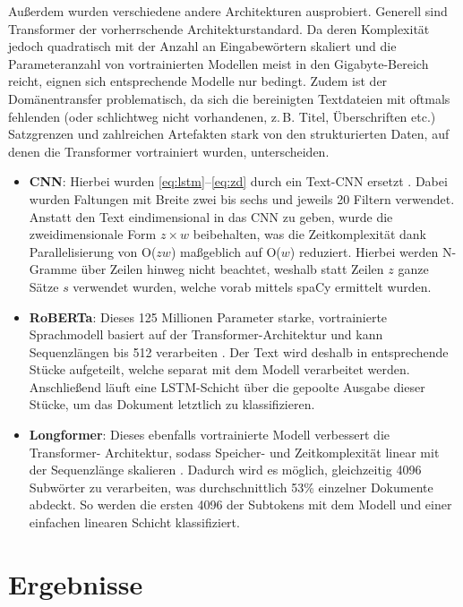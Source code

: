 \documentclass[bachelor,german]{info1thesis}
\begin{document}
%
\newpage
\noindent Außerdem wurden verschiedene andere Architekturen ausprobiert. Generell sind Transformer der vorherrschende Architekturstandard. Da deren Komplexität jedoch quadratisch mit der Anzahl an Eingabewörtern skaliert und die Parameteranzahl von vortrainierten Modellen meist in den Gigabyte-Bereich reicht, eignen sich entsprechende Modelle nur bedingt. Zudem ist der Domänentransfer problematisch, da sich die bereinigten Textdateien mit oftmals fehlenden (oder schlichtweg nicht vorhandenen, z.\,B. Titel, Überschriften etc.) Satzgrenzen und zahlreichen Artefakten stark von den strukturierten Daten, auf denen die Transformer vortrainiert wurden, unterscheiden.
\begin{itemize}
\item \textbf{CNN}: Hierbei wurden \autoref{eq:lstm}--\ref{eq:zd} durch ein Text-CNN ersetzt \cite{Kim2014}. Dabei wurden Faltungen mit Breite zwei bis sechs und jeweils 20 Filtern verwendet. Anstatt den Text eindimensional in das CNN zu geben, wurde die zweidimensionale Form $z \times w$ beibehalten, was die Zeitkomplexität dank Parallelisierung von O($zw$) maßgeblich auf O($w$) reduziert. Hierbei werden N-Gramme über Zeilen hinweg nicht beachtet, weshalb statt Zeilen $z$ ganze Sätze $s$ verwendet wurden, welche vorab mittels spaCy ermittelt wurden.
\item \textbf{RoBERTa}: Dieses 125 Millionen Parameter starke, vortrainierte Sprachmodell basiert auf der Transformer-Architektur und kann Sequenzlängen bis 512 verarbeiten \cite{Liu2019}. Der Text wird deshalb in entsprechende Stücke aufgeteilt, welche separat mit dem Modell verarbeitet werden. Anschließend läuft eine LSTM-Schicht über die gepoolte Ausgabe dieser Stücke, um das Dokument letztlich zu klassifizieren.
\item \textbf{Longformer}: Dieses ebenfalls vortrainierte Modell verbessert die Transformer- Architektur, sodass Speicher- und Zeitkomplexität linear mit der Sequenzlänge skalieren \cite{Beltagy2020}. Dadurch wird es möglich, gleichzeitig 4096 Subwörter zu verarbeiten, was durchschnittlich 53\% einzelner Dokumente abdeckt. So werden die ersten 4096 der Subtokens mit dem Modell und einer einfachen linearen Schicht klassifiziert. 
\end{itemize}
%


\chapter{Ergebnisse}
\end{document}
